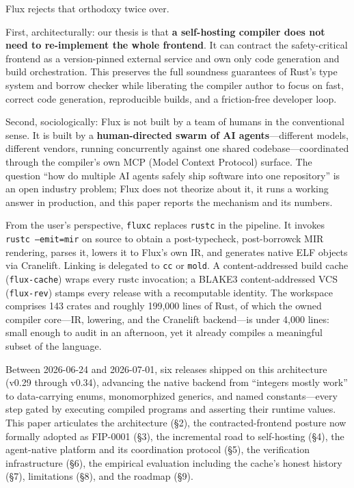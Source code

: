 Flux rejects that orthodoxy twice over.

First, architecturally: our thesis is that \textbf{a self-hosting compiler does not need to re-implement the whole frontend}. It can contract the safety-critical frontend as a version-pinned external service and own only code generation and build orchestration. This preserves the full soundness guarantees of Rust's type system and borrow checker while liberating the compiler author to focus on fast, correct code generation, reproducible builds, and a friction-free developer loop.

Second, sociologically: Flux is not built by a team of humans in the conventional sense. It is built by a \textbf{human-directed swarm of AI agents}---different models, different vendors, running concurrently against one shared codebase---coordinated through the compiler's own MCP (Model Context Protocol) surface. The question ``how do multiple AI agents safely ship software into one repository'' is an open industry problem; Flux does not theorize about it, it runs a working answer in production, and this paper reports the mechanism and its numbers.

From the user's perspective, \texttt{fluxc} replaces \texttt{rustc} in the pipeline. It invokes \texttt{rustc --emit=mir} on source to obtain a post-typecheck, post-borrowck MIR rendering, parses it, lowers it to Flux's own IR, and generates native ELF objects via Cranelift. Linking is delegated to \texttt{cc} or \texttt{mold}. A content-addressed build cache (\texttt{flux-cache}) wraps every rustc invocation; a BLAKE3 content-addressed VCS (\texttt{flux-rev}) stamps every release with a recomputable identity. The workspace comprises 143 crates and roughly 199{,}000 lines of Rust, of which the owned compiler core---IR, lowering, and the Cranelift backend---is under 4{,}000 lines: small enough to audit in an afternoon, yet it already compiles a meaningful subset of the language.

Between 2026-06-24 and 2026-07-01, six releases shipped on this architecture (v0.29 through v0.34), advancing the native backend from ``integers mostly work'' to data-carrying enums, monomorphized generics, and named constants---every step gated by executing compiled programs and asserting their runtime values. This paper articulates the architecture (\S2), the contracted-frontend posture now formally adopted as FIP-0001 (\S3), the incremental road to self-hosting (\S4), the agent-native platform and its coordination protocol (\S5), the verification infrastructure (\S6), the empirical evaluation including the cache's honest history (\S7), limitations (\S8), and the roadmap (\S9).


